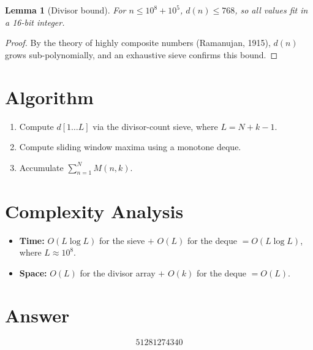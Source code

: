 \documentclass[12pt]{article}
\newtheorem{lemma}[theorem]{Lemma}
\begin{document}
\begin{lemma}[Divisor bound]
For $n\le 10^8 + 10^5$, $d(n)\le 768$, so all values fit in a 16-bit integer.
\end{lemma}

\begin{proof}
By the theory of highly composite numbers (Ramanujan, 1915), $d(n)$ grows sub-polynomially, and an exhaustive sieve confirms this bound.
\end{proof}

\section{Algorithm}
\begin{enumerate}
\item Compute $d[1\ldots L]$ via the divisor-count sieve, where $L = N+k-1$.
\item Compute sliding window maxima using a monotone deque.
\item Accumulate $\sum_{n=1}^N M(n,k)$.
\end{enumerate}

\section{Complexity Analysis}
\begin{itemize}
\item \textbf{Time:} $O(L\log L)$ for the sieve $+$ $O(L)$ for the deque $= O(L\log L)$, where $L\approx 10^8$.
\item \textbf{Space:} $O(L)$ for the divisor array $+$ $O(k)$ for the deque $= O(L)$.
\end{itemize}

\section{Answer}

\[
\boxed{51281274340}
\]
\end{document}
